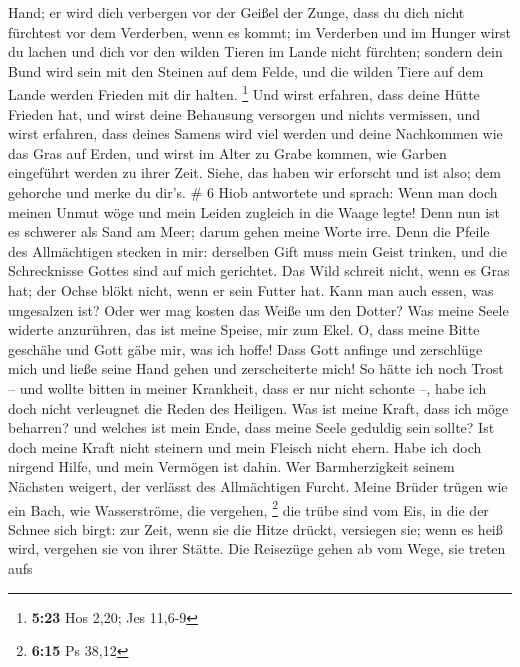 Hand;  er wird dich verbergen vor der Geißel der Zunge,
dass du dich nicht fürchtest vor dem Verderben, wenn es kommt;
 im Verderben und im Hunger wirst du lachen und dich vor
den wilden Tieren im Lande nicht fürchten;  sondern dein
Bund wird sein mit den Steinen auf dem Felde, und die wilden Tiere auf
dem Lande werden Frieden mit dir halten. \footnote{\textbf{5:23} Hos
  2,20; Jes 11,6-9}  Und wirst erfahren, dass deine Hütte
Frieden hat, und wirst deine Behausung versorgen und nichts vermissen,
 und wirst erfahren, dass deines Samens wird viel werden
und deine Nachkommen wie das Gras auf Erden,  und wirst
im Alter zu Grabe kommen, wie Garben eingeführt werden zu ihrer Zeit.
 Siehe, das haben wir erforscht und ist also; dem
gehorche und merke du dir's. \# 6  Hiob antwortete und
sprach:  Wenn man doch meinen Unmut wöge und mein Leiden
zugleich in die Waage legte!  Denn nun ist es schwerer als
Sand am Meer; darum gehen meine Worte irre.  Denn die
Pfeile des Allmächtigen stecken in mir: derselben Gift muss mein Geist
trinken, und die Schrecknisse Gottes sind auf mich gerichtet.
 Das Wild schreit nicht, wenn es Gras hat; der Ochse blökt
nicht, wenn er sein Futter hat.  Kann man auch essen, was
ungesalzen ist? Oder wer mag kosten das Weiße um den Dotter?
 Was meine Seele widerte anzurühren, das ist meine Speise,
mir zum Ekel.  O, dass meine Bitte geschähe und Gott gäbe
mir, was ich hoffe!  Dass Gott anfinge und zerschlüge mich
und ließe seine Hand gehen und zerscheiterte mich!  So
hätte ich noch Trost -- und wollte bitten in meiner Krankheit, dass er
nur nicht schonte --, habe ich doch nicht verleugnet die Reden des
Heiligen.  Was ist meine Kraft, dass ich möge beharren?
und welches ist mein Ende, dass meine Seele geduldig sein sollte?
 Ist doch meine Kraft nicht steinern und mein Fleisch
nicht ehern.  Habe ich doch nirgend Hilfe, und mein
Vermögen ist dahin.  Wer Barmherzigkeit seinem Nächsten
weigert, der verlässt des Allmächtigen Furcht.  Meine
Brüder trügen wie ein Bach, wie Wasserströme, die vergehen, \footnote{\textbf{6:15}
  Ps 38,12}  die trübe sind vom Eis, in die der Schnee
sich birgt:  zur Zeit, wenn sie die Hitze drückt,
versiegen sie; wenn es heiß wird, vergehen sie von ihrer Stätte.
 Die Reisezüge gehen ab vom Wege, sie treten aufs
